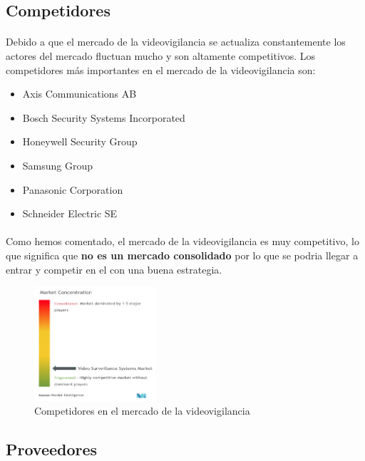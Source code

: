 \documentclass{report}
\begin{document}
        \subsection{Competidores}
          \paragraph*{}{Debido a que el mercado de la videovigilancia se actualiza constantemente los actores del mercado fluctuan mucho y son altamente competitivos. Los competidores más importantes en el mercado de la videovigilancia son:}
          \begin{multicols}{3}
            \begin{itemize}
              \item Axis Communications AB
              \item Bosch Security Systems Incorporated
              \item Honeywell Security Group
              \item Samsung Group
              \item Panasonic Corporation
              \item Schneider Electric SE
            \end{itemize}
          \end{multicols}
          \paragraph*{}{Como hemos comentado, el mercado de la videovigilancia es muy competitivo, lo que significa que \textbf{no es un mercado consolidado} por lo que se podria llegar a entrar y competir en el con una buena estrategia.}
          \begin{figure}[H]
            \centering
            \includegraphics[width=0.4\textwidth]{./img/competidores.png}
            \caption{Competidores en el mercado de la videovigilancia}
          \end{figure}
        \subsection{Proveedores}
\end{document}
